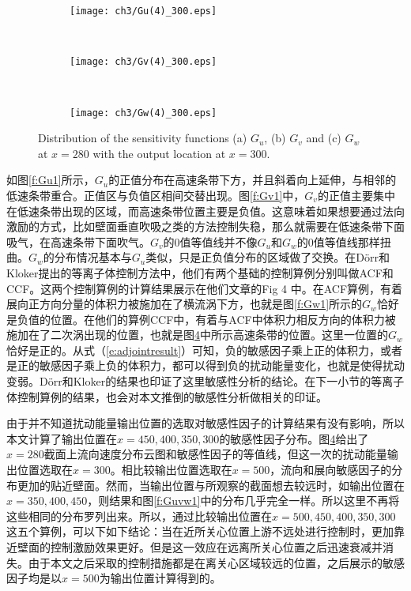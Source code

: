 \begin{figure}[H]
  \centering
  \begin{subfigure}{0.8\textwidth}
  \texttt{[image: ch3/Gu(4)\_300.eps]}
  \caption{\label{f:Gu1_300}}
  \end{subfigure}\\
  \bigskip
  \begin{subfigure}{0.8\textwidth}
  \texttt{[image: ch3/Gv(4)\_300.eps]}
  \caption{\label{f:Gv1_300}}
  \end{subfigure}\\
  \bigskip
  \begin{subfigure}{0.8\textwidth}
  \texttt{[image: ch3/Gw(4)\_300.eps]}
  \caption{\label{f:Gw1_300}}
  \end{subfigure}
  \caption{Distribution of the sensitivity functions (a) $G_u$, (b) $G_v$ and (c) $G_w$ at $x =280$ with the output location at $x =300$.}\label{f:Guvw1_300}
\end{figure}

如图\ref{f:Gu1}所示，$G_u$的正值分布在高速条带下方，并且斜着向上延伸，与相邻的低速条带重合。正值区与负值区相间交替出现。图\ref{f:Gv1}中，$G_v$的正值主要集中在低速条带出现的区域，而高速条带位置主要是负值。这意味着如果想要通过法向激励的方式，比如壁面垂直吹吸之类的方法控制失稳，那么就需要在低速条带下面吸气，在高速条带下面吹气。$G_v$的0值等值线并不像$G_u$和$G_w$的0值等值线那样扭曲。$G_w$的分布情况基本与$G_u$类似，只是正负值分布的区域做了交换。在D\"orr和Kloker\cite{dorr2016}提出的等离子体控制方法中，他们有两个基础的控制算例分别叫做ACF和CCF。这两个控制算例的计算结果展示在他们文章的Fig 4 中。在ACF算例，有着展向正方向分量的体积力被施加在了横流涡下方，也就是图\ref{f:Gw1}所示的$G_w$恰好是负值的位置。在他们的算例CCF中，有着与ACF中体积力相反方向的体积力被施加在了二次涡出现的位置，也就是图\ref{f:Guvw1_300}中所示高速条带的位置。这里一位置的$G_w$恰好是正的。从式（\ref{e:adjointresult}）可知，负的敏感因子乘上正的体积力，或者是正的敏感因子乘上负的体积力，都可以得到负的扰动能量变化，也就是使得扰动变弱。D\"orr和Kloker\cite{dorr2016}的结果也印证了这里敏感性分析的结论。在下一小节的等离子体控制算例的结果，也会对本文推倒的敏感性分析做相关的印证。

由于并不知道扰动能量输出位置的选取对敏感性因子的计算结果有没有影响，所以本文计算了输出位置在$x=450,400,350,300$的敏感性因子分布。图\ref{f:Guvw1_300}给出了$x=280$截面上流向速度分布云图和敏感性因子的等值线，但这一次的扰动能量输出位置选取在$x=300$。相比较输出位置选取在$x=500$，流向和展向敏感因子的分布更加的贴近壁面。然而，当输出位置与所观察的截面想去较远时，如输出位置在$x=350,400,450$，则结果和图\ref{f:Guvw1}中的分布几乎完全一样。所以这里不再将这些相同的分布罗列出来。所以，通过比较输出位置在$x=500,450,400,350,300$这五个算例，可以下如下结论：当在近所关心位置上游不远处进行控制时，更加靠近壁面的控制激励效果更好。但是这一效应在远离所关心位置之后迅速衰减并消失。由于本文之后采取的控制措施都是在离关心区域较远的位置，之后展示的敏感因子均是以$x=500$为输出位置计算得到的。

